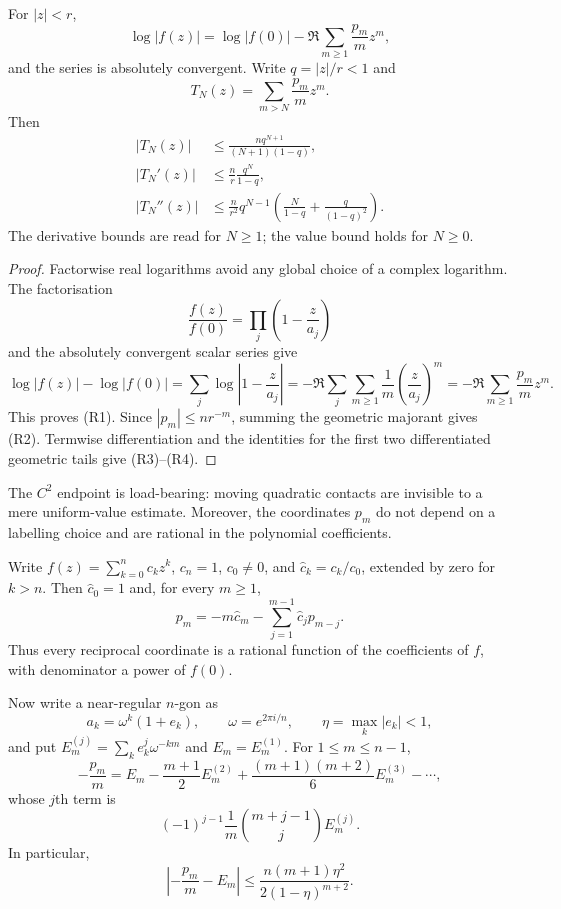 \documentclass[11pt]{article}
\begin{document}
\begin{theorem}
\label{res:reciprocal-expansion}
For $|z|<r$,
\[
 \log|f(z)|
 =\log|f(0)|-\Re\sum_{m\ge1}\frac{p_m}{m}z^m,          \tag{R1}
\]
and the series is absolutely convergent.  Write $q=|z|/r<1$ and
\[
 T_N(z)=\sum_{m>N}\frac{p_m}{m}z^m.
\]
Then
\begin{align*}
 |T_N(z)|
 &\le \frac{nq^{N+1}}{(N+1)(1-q)},                     \tag{R2}\\
 |T_N'(z)|
 &\le \frac nr\frac{q^N}{1-q},                         \tag{R3}\\
 |T_N''(z)|
 &\le \frac n{r^2}q^{N-1}
       \left(\frac N{1-q}+\frac q{(1-q)^2}\right).     \tag{R4}
\end{align*}
The derivative bounds are read for $N\ge1$; the value bound holds for
$N\ge0$.
\end{theorem}

\begin{proof}
Factorwise real logarithms avoid any global choice of a complex logarithm.
The factorisation
\[
 \frac{f(z)}{f(0)}=\prod_j\left(1-\frac z{a_j}\right)
\]
and the absolutely convergent scalar series give
\[
 \log|f(z)|-\log|f(0)|
 =\sum_j\log\left|1-\frac z{a_j}\right|
 =-\Re\sum_j\sum_{m\ge1}\frac1m
       \left(\frac z{a_j}\right)^m
 =-\Re\sum_{m\ge1}\frac{p_m}{m}z^m.
\]
This proves (R1).  Since $|p_m|\le nr^{-m}$, summing the geometric majorant
gives (R2).  Termwise differentiation and the identities for the first two
differentiated geometric tails give (R3)--(R4).
\end{proof}

The $C^2$ endpoint is load-bearing: moving quadratic contacts are invisible
to a mere uniform-value estimate.  Moreover, the coordinates $p_m$ do not
depend on a labelling choice and are rational in the polynomial
coefficients.

\begin{proposition}
\label{res:reciprocal-rationality}
Write $f(z)=\sum_{k=0}^n c_kz^k$, $c_n=1$, $c_0\ne0$, and
$\widehat c_k=c_k/c_0$, extended by zero for $k>n$.  Then
$\widehat c_0=1$ and, for every $m\ge1$,
\[
 p_m=-m\widehat c_m-
      \sum_{j=1}^{m-1}\widehat c_jp_{m-j}.              \tag{R5}
\]
Thus every reciprocal coordinate is a rational function of the coefficients
of $f$, with denominator a power of $f(0)$.

Now write a near-regular $n$-gon as
\[
 a_k=\omega^k(1+e_k),\qquad
 \omega=e^{2\pi i/n},\qquad \eta=\max_k|e_k|<1,
\]
and put $E_m^{(j)}=\sum_ke_k^j\omega^{-km}$ and
$E_m=E_m^{(1)}$.  For $1\le m\le n-1$,
\[
 -\frac{p_m}{m}
 =E_m-\frac{m+1}{2}E_m^{(2)}
   +\frac{(m+1)(m+2)}6E_m^{(3)}-\cdots,                \tag{R6}
\]
whose $j$th term is
\[
 (-1)^{j-1}\frac1m\binom{m+j-1}{j}E_m^{(j)}.
\]
In particular,
\[
 \left|-\frac{p_m}{m}-E_m\right|
 \le \frac{n(m+1)\eta^2}{2(1-\eta)^{m+2}}.             \tag{R7}
\]
\end{proposition}
\end{document}
